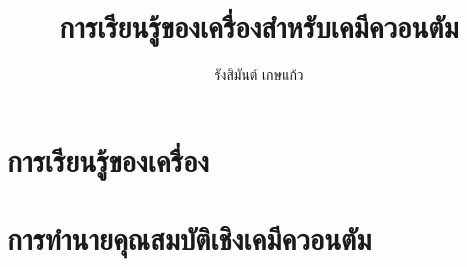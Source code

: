 



\let\cleardoublepage\clearpage

\title{การเรียนรู้ของเครื่องสำหรับเคมีควอนตัม}
\author{รังสิมันต์ เกษแก้ว}





\newpage
{}
\newpage

\frontmatter







\pagestyle{fancy} %

\mainmatter
\part{การเรียนรู้ของเครื่อง}
\part{การทำนายคุณสมบัติเชิงเคมีควอนตัม}

\begin{appendices}
\renewcommand{\thesection}{\arabic{section}} %
\end{appendices}

\backmatter







